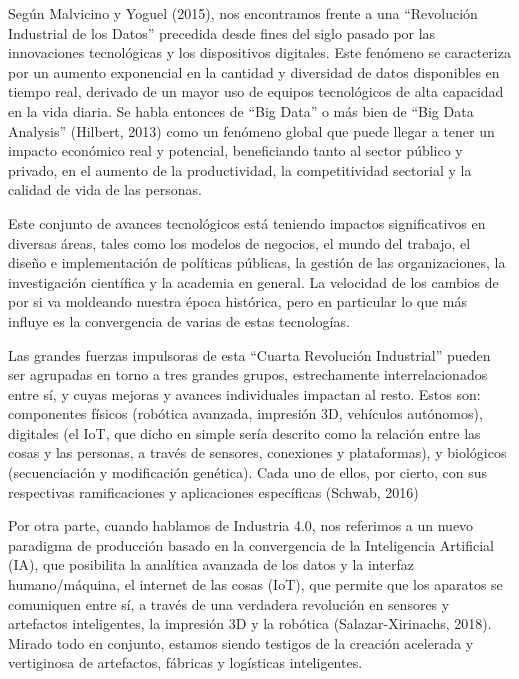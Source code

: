 \documentclass[
  10pt,
  letterpaper,
]{report}
\begin{document}
Según Malvicino y Yoguel (2015), nos encontramos frente a una
``Revolución Industrial de los Datos'' precedida desde fines del siglo
pasado por las innovaciones tecnológicas y los dispositivos digitales.
Este fenómeno se caracteriza por un aumento exponencial en la cantidad y
diversidad de datos disponibles en tiempo real, derivado de un mayor uso
de equipos tecnológicos de alta capacidad en la vida diaria. Se habla
entonces de ``Big Data'' o más bien de ``Big Data Analysis'' (Hilbert,
2013) como un fenómeno global que puede llegar a tener un impacto
económico real y potencial, beneficiando tanto al sector público y
privado, en el aumento de la productividad, la competitividad sectorial
y la calidad de vida de las personas.

Este conjunto de avances tecnológicos está teniendo impactos
significativos en diversas áreas, tales como los modelos de negocios, el
mundo del trabajo, el diseño e implementación de políticas públicas, la
gestión de las organizaciones, la investigación científica y la academia
en general. La velocidad de los cambios de por si va moldeando nuestra
época histórica, pero en particular lo que más influye es la
convergencia de varias de estas tecnologías.

Las grandes fuerzas impulsoras de esta ``Cuarta Revolución Industrial''
pueden ser agrupadas en torno a tres grandes grupos, estrechamente
interrelacionados entre sí, y cuyas mejoras y avances individuales
impactan al resto. Estos son: componentes físicos (robótica avanzada,
impresión 3D, vehículos autónomos), digitales (el IoT, que dicho en
simple sería descrito como la relación entre las cosas y las personas, a
través de sensores, conexiones y plataformas), y biológicos
(secuenciación y modificación genética). Cada uno de ellos, por cierto,
con sus respectivas ramificaciones y aplicaciones específicas (Schwab,
2016)

Por otra parte, cuando hablamos de Industria 4.0, nos referimos a un
nuevo paradigma de producción basado en la convergencia de la
Inteligencia Artificial (IA), que posibilita la analítica avanzada de
los datos y la interfaz humano/máquina, el internet de las cosas (IoT),
que permite que los aparatos se comuniquen entre sí, a través de una
verdadera revolución en sensores y artefactos inteligentes, la impresión
3D y la robótica (Salazar-Xirinachs, 2018). Mirado todo en conjunto,
estamos siendo testigos de la creación acelerada y vertiginosa de
artefactos, fábricas y logísticas inteligentes.
\end{document}
